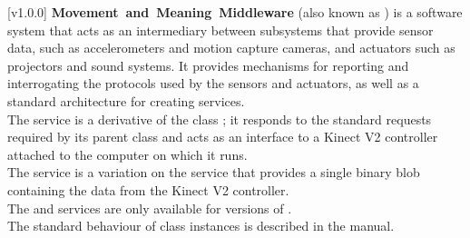 [v1.0.0]
\textbf{Movement~and~Meaning~Middleware} (also known as \mplusm) is a software system
that acts as an intermediary between subsystems that provide sensor data, such as
accelerometers and motion capture cameras, and actuators such as projectors and sound
systems.
It provides mechanisms for reporting and interrogating the protocols used by the sensors
and actuators, as well as a standard architecture for creating services.\\

The \KVtwoI{} service is a derivative of the \mplusm{} class ;
it responds to the standard requests required by its parent class and acts as an interface
to a Kinect V2 controller attached to the computer on which it runs.\\

The \KVtwoBI{} service is a variation on the \KVtwoI{} service that provides a single
binary blob containing the data from the Kinect V2 controller.\\

The \KVtwoI{} and \KVtwoBI{} services are only available for \win{} versions of \mplusm.\\

The standard behaviour of  class instances is described in
the \emph{\MMM} manual.
\primaryEnd{}
